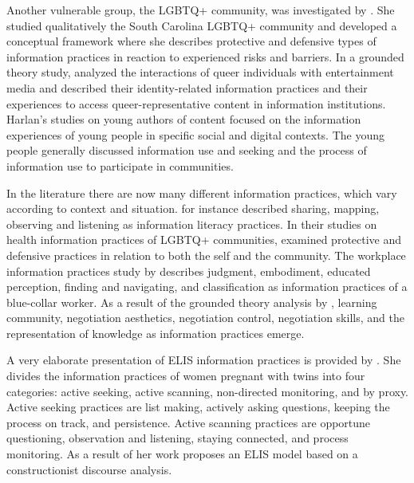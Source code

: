 \documentclass[12pt, a4paper, titlepage, oneside, abstract=true, toc=listof, toc=bibliography, BCOR=1cm]{scrreprt}
\begin{document}
Another vulnerable group, the LGBTQ+ community, was investigated by \citet{Kitzie2020}. She studied qualitatively the South Carolina LGBTQ+ community and developed a conceptual framework where she describes protective and defensive types of information practices in reaction to experienced risks and barriers. In a grounded theory study, \citet{Floegel2019} analyzed the interactions of queer individuals with entertainment media and described their identity-related information practices and their experiences to access queer-representative content in information institutions. Harlan's studies \citep{Harlan2012, Harlan2012a, Harlan2014} on young authors of content focused on the information experiences of young people in specific social and digital contexts. The young people generally discussed information use and seeking and the process of information use to participate in communities. 

In the literature there are now many different information practices, which vary according to context and situation. \citet{Lloyd2013} for instance described sharing, mapping, observing and listening as information literacy practices. In their studies on health information practices of LGBTQ+ communities, \citet{Kitzie2020} examined protective and defensive practices in relation to both the self and the community. The workplace information practices study by \citet{Veinot2007} describes judgment, embodiment, educated perception, finding and navigating, and classification as information practices of a blue-collar worker. As a result of the grounded theory analysis by \citet{Harlan2012}, learning community, negotiation aesthetics, negotiation control, negotiation skills, and the representation of knowledge as information practices emerge.

A very elaborate presentation of ELIS information practices is provided by \citet{McKenzie2002, McKenzie2003}. She divides the information practices of women pregnant with twins into four categories: active seeking, active scanning, non-directed monitoring, and by proxy. Active seeking practices are list making, actively asking questions, keeping the process on track, and persistence.  Active scanning practices are opportune questioning, observation and listening, staying connected, and process monitoring. As a result of her work \citet{McKenzie2003a} proposes an ELIS model based on a constructionist discourse analysis.
\end{document}
